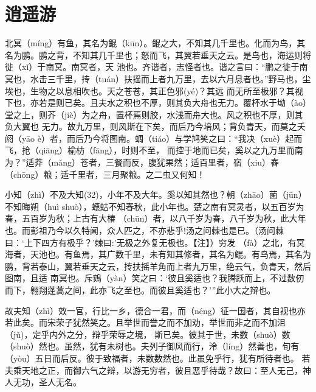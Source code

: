 \chapter{逍遥游}

北冥（míng）有鱼，其名为鲲（kūn）。鲲之大，不知其几千里也。化而为鸟，其名为鹏。鹏之背，不知其几千里也；怒而飞，其翼若垂天之云。是鸟也，海运则将徙（xǐ）于南冥。南冥者，天
池也。齐谐者，志怪者也。谐之言曰：“鹏之徙于南冥也，水击三千里，抟（tuán）扶摇而上者九万里，去以六月息者也。”野马也，尘埃也，生物之以息相吹也。天之苍苍，其正色邪(yé)？其远
而无所至极邪？其视下也，亦若是则已矣。且夫水之积也不厚，则其负大舟也无力。覆杯水于坳（ào）堂之上，则芥（jiè）为之舟，置杯焉则胶，水浅而舟大也。风之积也不厚，则其负大翼也
无力。故九万里，则风斯在下矣，而后乃今培风；背负青天，而莫之夭阏（yāo è）者，而后乃今将图南。蜩（tiáo）与学鸠笑之曰：“我决（xuè）起而飞，抢（qiāng）榆枋（fāng），时则不至，
而控于地而已矣，奚以之九万里而南为？”适莽（mǎng）苍者，三餐而反，腹犹果然；适百里者，宿（xiu）舂（chōng）粮；适千里者，三月聚粮。之二虫又何知！

小知（zhì）不及大知(32)，小年不及大年。奚以知其然也？朝（zhāo）菌（jūn）不知晦朔（huì shuò），蟪蛄不知春秋，此小年也。楚之南有冥灵者，以五百岁为春，五百岁为秋；上古有大椿
（chūn）者，以八千岁为春，八千岁为秋，此大年也。而彭祖乃今以久特闻，众人匹之，不亦悲乎!汤之问棘也是已。（汤问棘曰：‘上下四方有极乎？’棘曰:'无极之外复无极也。【注】）穷发
（fà）之北，有冥海者，天池也。有鱼焉，其广数千里，未有知其修者，其名为鲲。有鸟焉，其名为鹏，背若泰山，翼若垂天之云，抟扶摇羊角而上者九万里，绝云气，负青天，然后图南，且适
南冥也。斥鴳（yàn）笑之曰：‘彼且奚适也？我腾跃而上，不过数仞而下，翱翔蓬蒿之间，此亦飞之至也。而彼且奚适也？’”此小大之辩也。

故夫知（zhì）效一官，行比一乡，德合一君，而（néng）征一国者，其自视也亦若此矣。而宋荣子犹然笑之。且举世而誉之而不加劝，举世而非之而不加沮（jǔ)，定乎内外之分，辩乎荣辱之境，
斯已矣。彼其于世，未数（shuò）数（shuò）然也。虽然，犹有未树也。夫列子御风而行，泠（líng）然善也，旬有（yòu）五日而后反。彼于致福者，未数数然也。此虽免乎行，犹有所待者也。
若夫乘天地之正，而御六气之辩，以游无穷者，彼且恶乎待哉？故曰：至人无己，神人无功，圣人无名。

